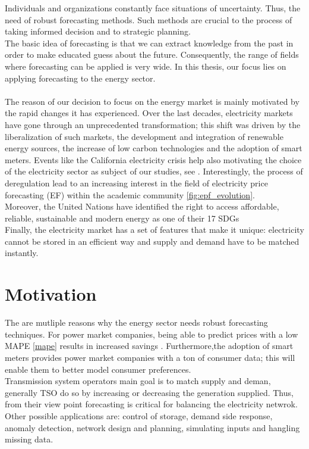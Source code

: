 Individuals and organizations constantly face situations of uncertainty. Thus, the need of robust forecasting methods. Such methods are crucial to the process of taking informed decision and to strategic planning.
\\
The basic idea of forecasting is that we can extract knowledge from the past in order to make educated guess about the future. Consequently, the range of fields where forecasting can be applied is very wide.
In this thesis, our focus lies on applying forecasting to the energy sector. 
\\
\\
The reason of our decision to focus on the energy market is mainly motivated by the rapid changes it has experienced.
Over the last decades, electricity markets have gone through an unprecedented transformation; this shift was driven by the liberalization of such markets, the development and integration of renewable energy sources, the  increase of low carbon technologies and the adoption of smart meters. Events like the California electricity crisis help also motivating the choice of the electricity sector as subject of our studies, see \cite{california}.
Interestingly, the process of deregulation lead to an increasing interest in the field of electricity price forecasting (EF) within the academic community \ref{fig:epf_evolution}.
\\
Moreover, the United Nations have identified the right to access affordable, reliable, sustainable and modern energy as one of their 17 SDGs \cite{un_sdgs}
\\
Finally, the electricity market has a set of features that make it unique: electricity cannot be stored in an efficient way and supply and demand have to be matched instantly.
\\
\section{Motivation}
The are mutliple reasons why the energy sector needs robust forecasting techniques.
For power market companies, being able to predict prices with a low MAPE \ref{mape} results in increased savings \cite{savings}. Furthermore,the adoption of smart meters provides power market companies with a ton of consumer data; this will enable them to better model consumer preferences.
\\
Transmission system operators main goal is to match supply and deman, generally TSO do so by increasing or decreasing the generation supplied. Thus, from their view point forecasting is critical for balancing the electricity netwrok.
\\
Other possible applications are: control of storage, demand side response, anomaly detection, network design and planning, simulating inputs and hangling missing data.
\\
